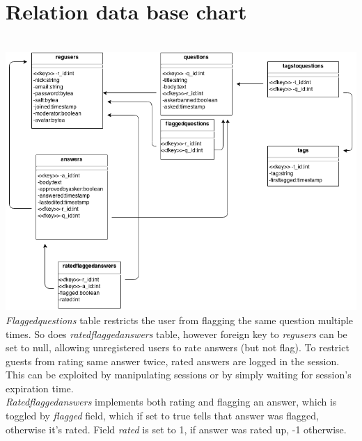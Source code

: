 \documentclass[a4paper,12pt]{article}
\begin{document}
\section{Relation data base chart}
\hspace*{\fill}\\
\includegraphics[scale=0.5]{RelationalDBChart}
\emph{Flaggedquestions} table restricts the user from flagging the same question multiple times. So does \emph{ratedflaggedanswers} table, however foreign key to \emph{regusers} can be set to null, allowing unregistered users to rate answers (but not flag). To restrict guests from rating same answer twice, rated answers are logged in the session. This can be exploited by manipulating sessions or by simply waiting for session's expiration time.\\
\emph{Ratedflaggedanswers} implements both rating and flagging an answer, which is toggled by \emph{flagged} field, which if set to true tells that answer was flagged, otherwise it's rated. Field \emph{rated} is set to 1, if answer was rated up, -1 otherwise.
\newpage
\end{document}

